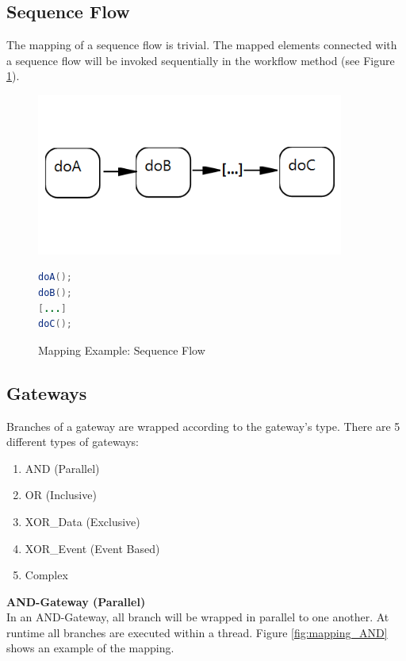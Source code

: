 \subsection{Sequence Flow}
The mapping of a sequence flow is trivial. The mapped elements connected with a sequence flow will be invoked sequentially in the workflow method (see Figure \ref{fig:mapping_sequence}).\\

\begin{figure}[h]
\begin{minipage}[c]{0.5\textwidth}
\includegraphics[width=0.9\textwidth]{images/mapping/sequence.png}
\end{minipage}
\begin{minipage}[c]{0.5\textwidth}
\begin{lstlisting}[language=Java]
doA();
doB();
[...]
doC();
\end{lstlisting}
\end{minipage}
\caption{Mapping Example: Sequence Flow}%
\label{fig:mapping_sequence}%
\end{figure}

\subsection{Gateways}
Branches of a gateway are wrapped according to the gateway's type. There are 5 different types of gateways:
\begin{enumerate}
	\item AND (Parallel)
	\item OR (Inclusive)
	\item XOR\_Data (Exclusive)
	\item XOR\_Event (Event Based)
	\item Complex 
\end{enumerate}

\textbf{AND-Gateway (Parallel)}\\
In an AND-Gateway, all branch will be wrapped in parallel to one another. At runtime all branches are executed within a thread. 
Figure \ref{fig:mapping_AND} shows an example of the mapping. \\


